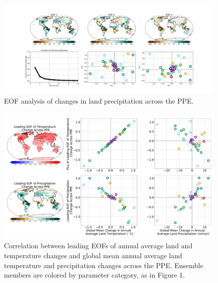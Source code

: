 \documentclass[draft,grl]{agutexSI2019}
\begin{document}
\begin{figure}[htb!]
\noindent\includegraphics[width=\textwidth]{writing/figs/Figure_S_PRECT_EOF_summary.pdf}
\caption{EOF analysis of changes in land precipitation across the PPE.}
\label{fig:supp_EOF_analysis_Precip}
\end{figure}

\begin{figure}[htb!]
\noindent\includegraphics[width=\textwidth]{writing/figs/Figure_S_Correlation_between_EOFs_and_global_mean_changes.pdf}
\caption{Correlation between leading EOFs of annual average land and temperature changes and global mean annual average land temperature and precipitation changes across the PPE. Ensemble members are colored by parameter category, as in Figure 1.}
\label{fig:supp_EOF_globalmetric_correlation}
\end{figure}
\end{document}
